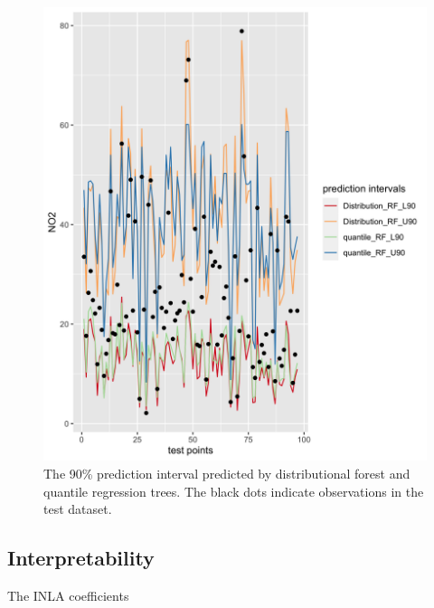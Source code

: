 \documentclass{article}
\begin{document}
\begin{figure}
\centering
\includegraphics[scale = 0.2]{fig/dist_vs_qrf.png}
\caption{The 90\% prediction interval predicted by distributional forest and quantile regression trees. The black dots indicate observations in the test dataset.}
\label{distvsquant}
\end{figure}

\subsection{Interpretability} 
The INLA coefficients
\end{document}
